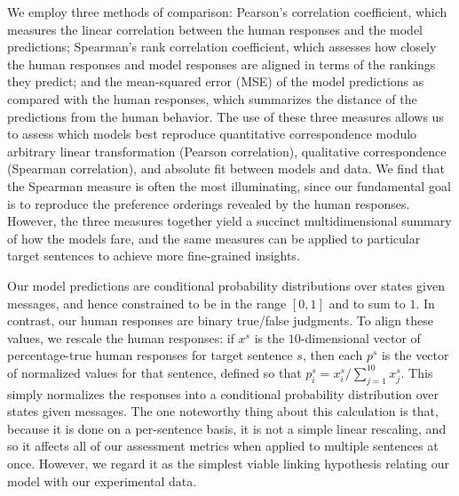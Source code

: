 \documentclass[leqno,12pt]{article}
\begin{document}
We employ three methods of comparison: Pearson's correlation
coefficient, which measures the linear correlation between the human
responses and the model predictions; Spearman's rank correlation
coefficient, which assesses how closely the human responses and model
responses are aligned in terms of the rankings they predict; and the
mean-squared error (MSE) of the model predictions as compared with the
human responses, which summarizes the distance of the predictions from
the human behavior. The use of these three measures allows us to
assess which models best reproduce quantitative correspondence modulo
arbitrary linear transformation (Pearson correlation), qualitative
correspondence (Spearman correlation), and absolute fit between models
and data. We find that the Spearman measure is often the most
illuminating, since our fundamental goal is to reproduce the
preference orderings revealed by the human responses.  However, the
three measures together yield a succinct multidimensional summary of
how the models fare, and the same measures can be applied to
particular target sentences to achieve more fine-grained insights.

Our model predictions are conditional probability distributions over
states given messages, and hence constrained to be in the range
$[0,1]$ and to sum to $1$. In contrast, our human responses are binary
true/false judgments. To align these values, we rescale the human
responses: if $x^{s}$ is the $10$-dimensional vector of
percentage-true human responses for target sentence $s$, then each
$p^{s}$ is the vector of normalized values for that sentence, defined
so that $p^{s}_{i} = x^{s}_{i}/\sum_{j=1}^{10}x^{s}_{j}$. This
simply normalizes the responses into a conditional probability
distribution over states given messages. The one noteworthy thing
about this calculation is that, because it is done on a per-sentence
basis, it is not a simple linear rescaling, and so it affects all of
our assessment metrics when applied to multiple sentences at
once. However, we regard it as the simplest viable linking hypothesis
relating our model with our experimental data.
\end{document}
